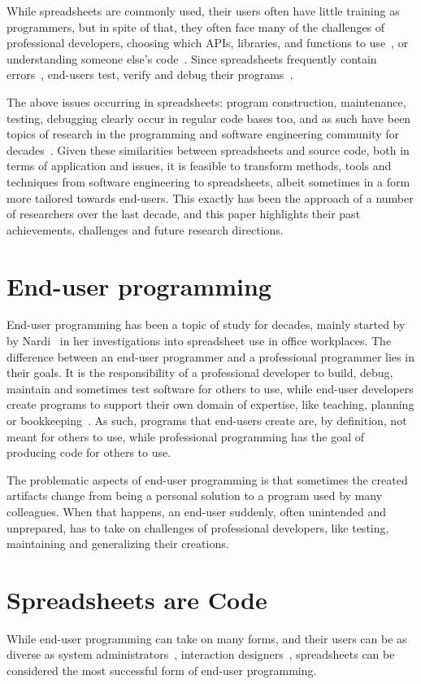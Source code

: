 \documentclass[conference]{IEEEtran}
\begin{document}
While spreadsheets are commonly used, their users often have little training as programmers, but in spite of that, they often face many of the challenges of professional developers, choosing which APIs, libraries, and functions to use~\cite{Ko2004}, or understanding someone else's code~\cite{Ko2011}. Since spreadsheets frequently contain errors~\cite{Panko1998}, end-users test, verify and debug their programs~\cite{Hermans2013-Cascon,Ko2004-Why}.

The above issues occurring in spreadsheets: program construction, maintenance, testing, debugging clearly occur in regular code bases too, and as such have been topics of research in the programming and software engineering community for decades~\cite{Ko2011}. Given these similarities between spreadsheets and source code, both in terms of application and issues, it is feasible to transform methods, tools and techniques from software engineering to spreadsheets, albeit sometimes in a form more tailored towards end-users. This exactly has been the approach of a number of researchers over the last decade, and this paper highlights their past achievements, challenges and future research directions. 


\section{End-user programming}
End-user programming has been a topic of study for decades, mainly started by by Nardi~\cite{Nardi1993} in her investigations into spreadsheet use in office workplaces. The difference between an end-user programmer and a professional programmer lies in their goals. It is the responsibility of a professional developer to build, debug, maintain and sometimes test software for others to use, while end-user developers create programs to support their own domain of expertise, like teaching, planning or bookkeeping~\cite{Ko2011}. As such, programs that end-users create are, by definition, not meant for others to use, while professional programming has the goal of producing code for others to use. 

The problematic aspects of end-user programming is that sometimes the created artifacts change from being a personal solution to a program used by many colleagues. When that happens, an end-user suddenly, often unintended and unprepared, has to take on challenges of professional developers, like testing, maintaining and generalizing their creations.

\section{Spreadsheets are Code}
While end-user programming can take on many forms, and their users can be as diverse as system administrators~\cite{Barrett2004}, interaction designers~\cite{Ko2004, brandt_opportunistic_2008, myers_how_2008}, spreadsheets can be considered the most successful form of end-user programming. 
\end{document}
